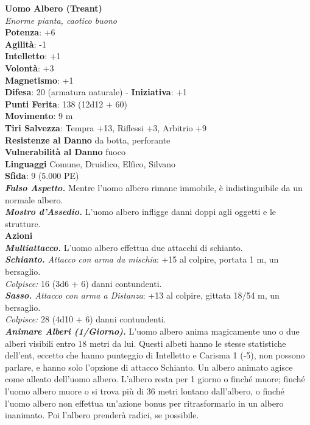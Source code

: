 \begin{multicols}{2}
\medskip\textbf{Uomo Albero (Treant)}\\
\emph{Enorme pianta, caotico buono}\\
\textbf{Potenza}: +6\\
\textbf{Agilità}: -1\\
\textbf{Intelletto}: +1\\
\textbf{Volontà}: +3\\
\textbf{Magnetismo}: +1\\
\textbf{Difesa}: 20 (armatura naturale) - \textbf{Iniziativa}: +1\\
\textbf{Punti Ferita}: 138 (12d12 + 60)\\
\textbf{Movimento}: 9 m\\
\textbf{Tiri Salvezza}: Tempra +13, Riflessi +3, Arbitrio +9\\
\textbf{Resistenze al Danno} da botta, perforante\\
\textbf{Vulnerabilità al Danno} fuoco\\
\textbf{Linguaggi} Comune, Druidico, Elfico, Silvano\\
\textbf{Sfida}: 9 (5.000 PE)\smallskip\\
\emph{\textbf{Falso Aspetto.}} Mentre l'uomo albero rimane immobile, è indistinguibile da un normale albero.\\
\emph{\textbf{Mostro d'Assedio.}} L'uomo albero infligge danni doppi agli oggetti e le strutture.\\
\smallskip\textbf{Azioni}\\
\emph{\textbf{Multiattacco.}} L'uomo albero effettua due attacchi di schianto.\\
\emph{\textbf{Schianto.} Attacco con arma da mischia}: +15 al colpire, portata 1 m, un bersaglio.\\
\emph{Colpisce:} 16 (3d6 + 6) danni contundenti.\\
\emph{\textbf{Sasso.} Attacco con arma a Distanza}: +13 al colpire, gittata 18/54 m, un bersaglio.\\
\emph{Colpisce:} 28 (4d10 + 6) danni contundenti.\\
\emph{\textbf{Animare Alberi (1/Giorno).}} L'uomo albero anima magicamente uno o due alberi visibili entro 18 metri da lui. Questi albeti hanno le stesse statistiche dell'ent, eccetto che hanno punteggio di Intelletto e Carisma 1 (-5), non possono parlare, e hanno solo l'opzione di attacco Schianto. Un albero animato agisce come alleato dell'uomo albero. L'albero resta per 1 giorno o finché muore; finché l'uomo albero muore o si trova più di 36 metri lontano dall'albero, o finché l'uomo albero non effettua un'azione bonus per ritrasformarlo in un albero inanimato. Poi l'albero prenderà radici, se possibile. \\

\end{multicols}
